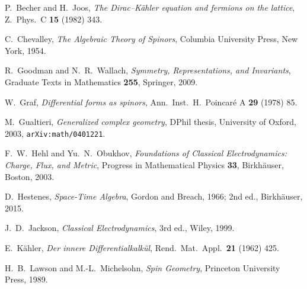  P.~Becher and H.~Joos, \emph{The Dirac--K\"ahler equation and fermions on the lattice}, Z.~Phys.~C \textbf{15} (1982) 343.

 C.~Chevalley, \emph{The Algebraic Theory of Spinors}, Columbia University Press, New York, 1954.

 R.~Goodman and N.~R.~Wallach, \emph{Symmetry, Representations, and Invariants}, Graduate Texts in Mathematics \textbf{255}, Springer, 2009.

 W.~Graf, \emph{Differential forms as spinors}, Ann.~Inst.~H.~Poincar\'e A \textbf{29} (1978) 85.

 M.~Gualtieri, \emph{Generalized complex geometry}, DPhil thesis, University of Oxford, 2003, \texttt{arXiv:math/0401221}.

 F.~W.~Hehl and Yu.~N.~Obukhov, \emph{Foundations of Classical Electrodynamics: Charge, Flux, and Metric}, Progress in Mathematical Physics \textbf{33}, Birkh\"auser, Boston, 2003.

 D.~Hestenes, \emph{Space-Time Algebra}, Gordon and Breach, 1966; 2nd ed., Birkh\"auser, 2015.

 J.~D.~Jackson, \emph{Classical Electrodynamics}, 3rd ed., Wiley, 1999.

 E.~K\"ahler, \emph{Der innere Differentialkalk\"ul}, Rend.~Mat.~Appl.~\textbf{21} (1962) 425.

 H.~B.~Lawson and M.-L.~Michelsohn, \emph{Spin Geometry}, Princeton University Press, 1989.
